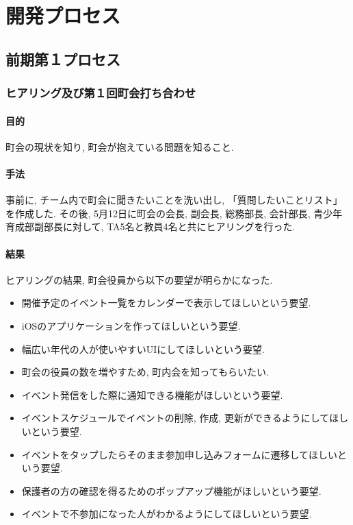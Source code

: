 \chapter{開発プロセス}

\section{前期第１プロセス}

\subsection{ヒアリング及び第１回町会打ち合わせ}
\subsubsection{目的}
町会の現状を知り, 町会が抱えている問題を知ること.
\subsubsection{手法}
事前に, チーム内で町会に聞きたいことを洗い出し, 「質問したいことリスト」を作成した.
その後, 5月12日に町会の会長, 副会長, 総務部長, 会計部長, 青少年育成部副部長に対して, TA5名と教員4名と共にヒアリングを行った.
\subsubsection{結果}
ヒアリングの結果, 町会役員から以下の要望が明らかになった.

\begin{itemize}
\item 開催予定のイベント一覧をカレンダーで表示してほしいという要望.
\item iOSのアプリケーションを作ってほしいという要望.
\item 幅広い年代の人が使いやすいUIにしてほしいという要望.
\item 町会の役員の数を増やすため, 町内会を知ってもらいたい.
\item イベント発信をした際に通知できる機能がほしいという要望.
\item イベントスケジュールでイベントの削除, 作成, 更新ができるようにしてほしいという要望.
\item イベントをタップしたらそのまま参加申し込みフォームに遷移してほしいという要望.
\item 保護者の方の確認を得るためのポップアップ機能がほしいという要望.
\item イベントで不参加になった人がわかるようにしてほしいという要望.
\end{itemize}

